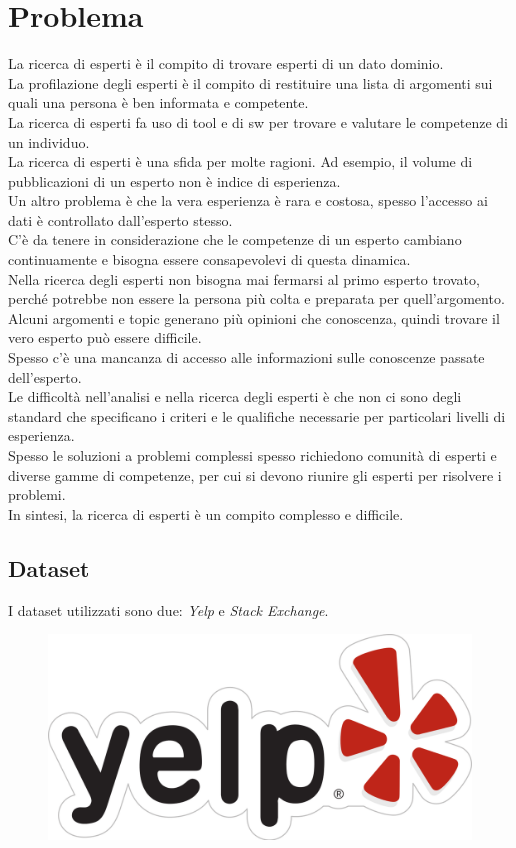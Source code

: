 \chapter{Problema}
La ricerca di esperti è il compito di trovare esperti di un dato dominio.\\ La profilazione degli esperti è il compito di restituire una lista di argomenti sui quali una persona è ben informata e competente.\\
La ricerca di esperti fa uso di tool e di sw per trovare e valutare le competenze di un individuo.\\
La ricerca di esperti è una sfida per molte ragioni. Ad esempio, il volume di pubblicazioni di un esperto non è indice di esperienza.\\
Un altro problema è che la vera esperienza è rara e costosa, spesso l'accesso ai dati è controllato dall'esperto stesso.\\
C'è da tenere in considerazione che le competenze di un esperto cambiano continuamente e bisogna essere  consapevolevi di questa dinamica.\\
Nella ricerca degli esperti non bisogna mai fermarsi al primo esperto trovato, perché potrebbe non essere la persona più colta e preparata per quell'argomento.\\
Alcuni argomenti e topic generano più opinioni che conoscenza, quindi trovare il vero esperto può essere difficile.\\
Spesso c'è una mancanza di accesso alle informazioni sulle conoscenze passate dell'esperto.\\
Le difficoltà nell'analisi e nella ricerca degli esperti è che non ci sono degli standard che specificano i criteri e le qualifiche necessarie per particolari livelli di esperienza.\\
Spesso le soluzioni a problemi complessi spesso richiedono comunità di esperti e diverse gamme di competenze, per cui si devono riunire gli esperti per risolvere i problemi.\\
In sintesi, la ricerca di esperti è un compito complesso e difficile.

\section{Dataset}
I dataset utilizzati sono due: \textit{Yelp} e \textit{Stack Exchange}.

\begin{figure}
    \centering
    \includegraphics[scale=0.1]{image/yelp.png}
    \label{fig:yelp}
\end{figure}
